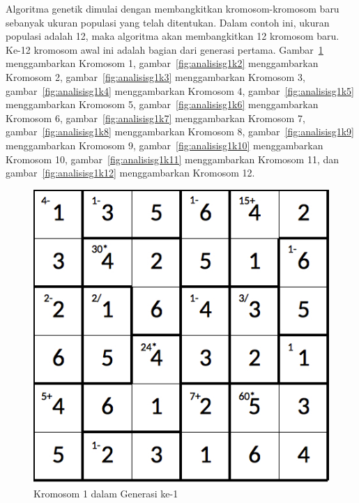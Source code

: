 Algoritma genetik dimulai dengan membangkitkan kromosom-kromosom baru sebanyak ukuran populasi yang telah ditentukan. Dalam contoh ini, ukuran populasi adalah 12, maka algoritma akan membangkitkan 12 kromosom baru. Ke-12 kromosom awal ini adalah bagian dari generasi pertama. Gambar~\ref{fig:analisisg1k1} menggambarkan Kromosom 1, gambar~\ref{fig:analisisg1k2} menggambarkan Kromosom 2, gambar~\ref{fig:analisisg1k3} menggambarkan Kromosom 3, gambar~\ref{fig:analisisg1k4} menggambarkan Kromosom 4, gambar~\ref{fig:analisisg1k5} menggambarkan Kromosom 5, gambar~\ref{fig:analisisg1k6} menggambarkan Kromosom 6, gambar~\ref{fig:analisisg1k7} menggambarkan Kromosom 7, gambar~\ref{fig:analisisg1k8} menggambarkan Kromosom 8, gambar~\ref{fig:analisisg1k9} menggambarkan Kromosom 9, gambar~\ref{fig:analisisg1k10} menggambarkan Kromosom 10, gambar~\ref{fig:analisisg1k11} menggambarkan Kromosom 11, dan gambar~\ref{fig:analisisg1k12} menggambarkan Kromosom 12.

\clearpage

\begin{figure}
\centering
\captionsetup{justification=centering}
\includegraphics[scale=0.333]{Gambar/hybridgenetic/Generation1Chromosome1}
\caption[Kromosom 1 dalam Generasi ke-1]{Kromosom 1 dalam Generasi ke-1}
\label{fig:analisisg1k1}
\end{figure}

